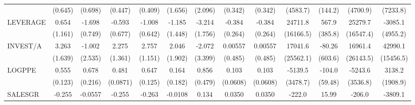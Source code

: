 \begin{table}[htbp]
\begin{tabular}{l*{12}{c}}
                    &     (0.645)         &     (0.698)         &     (0.447)         &     (0.409)         &     (1.656)         &     (2.096)         &     (0.342)         &     (0.342)         &    (4583.7)         &     (144.2)         &    (4700.9)         &    (7233.8)         \\
LEVERAGE            &       0.654         &      -1.698\sym{**} &      -0.593         &      -1.008         &      -1.185         &      -3.214\sym{*}  &      -0.384         &      -0.384         &     24711.8         &       567.9         &     25279.7         &     -3085.1         \\
                    &     (1.161)         &     (0.749)         &     (0.677)         &     (0.642)         &     (1.448)         &     (1.756)         &     (0.264)         &     (0.264)         &   (16166.5)         &     (385.8)         &   (16547.4)         &    (4955.2)         \\
INVEST/A            &       3.263\sym{*}  &      -1.002         &       2.275         &       2.757\sym{**} &       2.046         &      -2.072         &     0.00557         &     0.00557         &     17041.6         &      -80.26         &     16961.4         &     42990.1\sym{**} \\
                    &     (1.639)         &     (2.535)         &     (1.361)         &     (1.151)         &     (1.902)         &     (3.399)         &     (0.485)         &     (0.485)         &   (25562.1)         &     (603.6)         &   (26143.5)         &   (15456.5)         \\
LOGPPE              &       0.555\sym{***}&       0.678\sym{***}&       0.481\sym{***}&       0.647\sym{***}&       0.164         &       0.856         &       0.103         &       0.103         &     -5139.5         &      -104.0         &     -5243.6         &      3138.2         \\
                    &     (0.123)         &     (0.216)         &    (0.0871)         &     (0.125)         &     (0.182)         &     (0.479)         &    (0.0608)         &    (0.0608)         &    (3478.7)         &     (59.48)         &    (3536.8)         &    (1908.9)         \\
SALESGR             &      -0.255         &     -0.0557         &      -0.255         &      -0.263\sym{*}  &     -0.0108         &       0.134         &      0.0350         &      0.0350         &      -222.0         &       15.99         &      -206.0         &     -3809.1         \\

\end{tabular}
\end{table}

